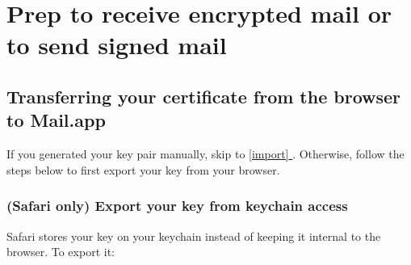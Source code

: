 \documentclass[pdftex,12pt,titlepage=false]{scrartcl}
\newcommand*{\fullref}[1]{\hyperref[{#1}]{\autoref*{#1} \nameref*{#1}}}
\begin{document}
\section{Prep to receive encrypted mail or to send signed mail}




\subsection{Transferring your certificate from the browser to Mail.app}\label{cert_install}
If you generated your key pair manually, skip to \fullref{import}.
Otherwise, follow the steps below to first export your key from your
browser.
\subsubsection{(Safari only) Export your key from keychain access}
Safari stores your key on your keychain instead of keeping it internal
to the browser.  To export it:

\end{document}
